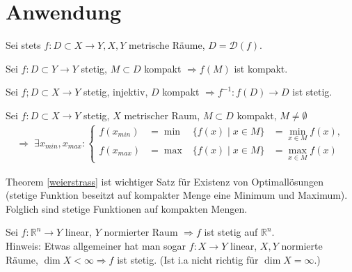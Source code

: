 \section{Anwendung}

Sei stets $f: D \subset X \to Y,X,Y$ metrische Räume, $D = \mathcal{D}(f)$.

\begin{proposition}
    Sei $f: D \subset Y \to Y$ stetig, $M \subset D$ kompakt $\Rightarrow f(M)$ ist kompakt.
\end{proposition}

\begin{proposition}
    Sei $f; D \subset X \to Y$ stetig, injektiv, $D$ kompakt $\Rightarrow f^{-1}:f(D) \to D$ ist stetig.
\end{proposition}

\begin{theorem}\label{weierstrass}
    Sei $f: D \subset X \to Y$ stetig, $X$ metrischer Raum, $M \subset D$ kompakt, $M \neq \emptyset$
    \begin{align}
	    \Rightarrow \; \exists x_{min}, x_{max} : \left\{
       \begin{alignedat}{3}
	        f(x_{min}) &= \min&\{f(x)\mid x \in M\} &= \min_{x\in M} f(x),\\
		f(x_{max}) &= \max&\{f(x)\mid x \in M\} &= \max_{x\in M} f(x)
	\end{alignedat}\right.
    \end{align}
\end{theorem}

\begin{remark}
    Theorem \ref{weierstrass} ist wichtiger Satz für Existenz von Optimallösungen (stetige Funktion beseitzt auf kompakter Menge eine Minimum und Maximum). Folglich sind stetige Funktionen auf kompakten Mengen.
\end{remark}

\begin{proposition}
    Sei $f: \mathbb{R}^n \to Y$ linear, $Y$ normierter Raum $\Rightarrow f$ ist stetig auf $\mathbb{R}^n$.\\
    Hinweis: Etwas allgemeiner hat man sogar $f: X \to Y$ linear, $X,Y$ normierte Räume, $\dim X < \infty \Rightarrow f $ ist stetig. (Ist i.a nicht richtig für $\dim X = \infty$.)
\end{proposition}

